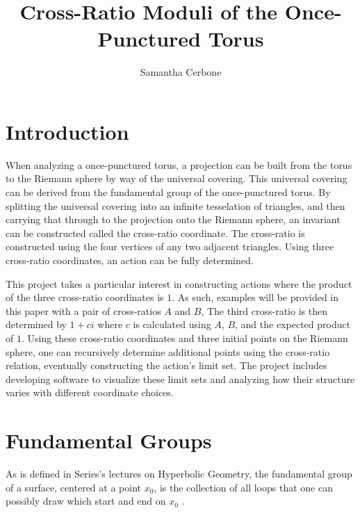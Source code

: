 \documentclass[12pt,a4paper,reqno,parskip=full]{amsart}
\numberwithin{equation}{section}
\theoremstyle{plain}
\theoremstyle{definition}
\begin{document}
\title{Cross-Ratio Moduli of the Once-Punctured Torus}


\author{Samantha Cerbone}

\maketitle

\section{Introduction}

When analyzing a once-punctured torus, a projection can be built from the torus to the Riemann sphere by way of the universal covering. This universal covering can be derived from the fundamental group of the once-punctured torus. By splitting the universal covering into an infinite tesselation of triangles, and then carrying that through to the projection onto the Riemann sphere, an invariant can be constructed called the cross-ratio coordinate. The cross-ratio is constructed using the four vertices of any two adjacent triangles. Using three cross-ratio coordinates, an action can be fully determined.

This project takes a particular interest in constructing actions where the product of the three cross-ratio coordinates is $1$. As such, examples will be provided in this paper with a pair of cross-ratios $A$ and $B$, The third cross-ratio is then determined by $1+ci$ where $c$ is calculated using $A$, $B$, and the expected product of $1$. Using these cross-ratio coordinates and three initial points on the Riemann sphere, one can recursively determine additional points using the cross-ratio relation, eventually constructing the action's limit set. The project includes developing software to visualize these limit sets and analyzing how their structure varies with different coordinate choices.

\section{Fundamental Groups}

As is defined in Series's lectures on Hyperbolic Geometry, the fundamental group of a surface, centered at a point $x_0$, is the collection of all loops that one can possibly draw which start and end on $x_0$ \cite{Series_Maloni_2013}. 
\end{document}
